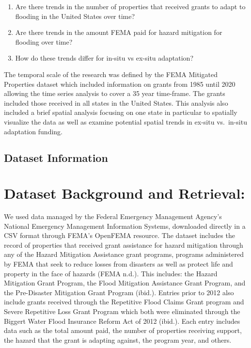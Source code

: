 \documentclass[
  12pt,
]{article}
\providecommand{\tightlist}{%
  \setlength{\itemsep}{0pt}\setlength{\parskip}{0pt}}
\begin{document}
\begin{enumerate}
\def\labelenumi{\arabic{enumi}.}
\tightlist
\item
  Are there trends in the number of properties that received grants to
  adapt to flooding in the United States over time?
\item
  Are there trends in the amount FEMA paid for hazard mitigation for
  flooding over time?
\item
  How do these trends differ for in-situ vs ex-situ adaptation?
\end{enumerate}

The temporal scale of the research was defined by the FEMA Mitigated
Properties dataset which included information on grants from 1985 until
2020 allowing the time series analysis to cover a 35 year time-frame.
The grants included those received in all states in the United States.
This analysis also included a brief spatial analysis focusing on one
state in particular to spatially visualize the data as well as examine
potential spatial trends in ex-situ vs.~in-situ adaptation funding.

\newpage

\hypertarget{dataset-information}{%
\subsection{Dataset Information}\label{dataset-information}}

\hypertarget{dataset-background-and-retrieval}{%
\section{Dataset Background and
Retrieval:}\label{dataset-background-and-retrieval}}

We used data managed by the Federal Emergency Management Agency's
National Emergency Management Information Systems, downloaded directly
in a CSV format through FEMA's OpenFEMA resource. The dataset includes
the record of properties that received grant assistance for hazard
mitigation through any of the Hazard Mitigation Assistance grant
programs, programs administered by FEMA that seek to reduce losses from
disasters as well as protect life and property in the face of hazards
(FEMA n.d.). This includes: the Hazard Mitigation Grant Program, the
Flood Mitigation Assistance Grant Program, and the Pre-Disaster
Mitigation Grant Program (ibid.). Entries prior to 2012 also include
grants received through the Repetitive Flood Claims Grant program and
Severe Repetitive Loss Grant Program which both were eliminated through
the Biggert Water Flood Insurance Reform Act of 2012 (ibid.). Each entry
includes data such as the total amount paid, the number of properties
receiving support, the hazard that the grant is adapting against, the
program year, and others.
\end{document}
